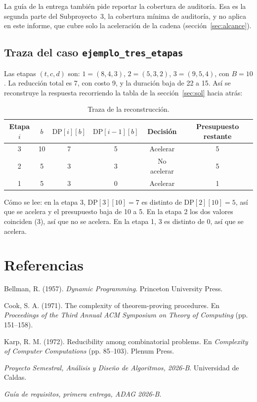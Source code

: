 \documentclass[11pt,a4paper]{article}
\newcommand{\DP}[2]{\mathrm{DP}[#1][#2]}
\theoremstyle{plano}
\begin{document}
La guía de la entrega también pide reportar la cobertura de auditoría. Esa es la segunda parte del Subproyecto~3, la cobertura mínima de auditoría, y no aplica en este informe, que cubre solo la aceleración de la cadena (sección~\ref{sec:alcance}).

\subsection{Traza del caso \texttt{ejemplo\_tres\_etapas}}
\label{sub:traza}

Las etapas $(t,c,d)$ son: $1=(8,4,3)$, $2=(5,3,2)$, $3=(9,5,4)$, con $B=10$. La reducción total es 7, con costo 9, y la duración baja de 22 a 15. Así se reconstruye la respuesta recorriendo la tabla de la sección~\ref{sec:sol} hacia atrás:

\begin{table}[h]
\centering
\begin{tabular}{cccccc}
\toprule
Etapa $i$ & $b$ & $\DP{i}{b}$ & $\DP{i-1}{b}$ & Decisión & Presupuesto restante \\
\midrule
3 & 10 & 7 & 5 & Acelerar & 5 \\
2 & 5 & 3 & 3 & No acelerar & 5 \\
1 & 5 & 3 & 0 & Acelerar & 1 \\
\bottomrule
\end{tabular}
\caption{Traza de la reconstrucción.}
\label{tab:traza}
\end{table}

Cómo se lee: en la etapa 3, $\DP{3}{10}=7$ es distinto de $\DP{2}{10}=5$, así que se acelera y el presupuesto baja de 10 a 5. En la etapa 2 los dos valores coinciden (3), así que no se acelera. En la etapa 1, 3 es distinto de 0, así que se acelera.

\section*{Referencias}
\begin{enumerate}[label={[\arabic*]},leftmargin=2em,itemsep=4pt]
  \item Bellman, R. (1957). \textit{Dynamic Programming}. Princeton University Press.
  \item Cook, S. A. (1971). The complexity of theorem-proving procedures. En \textit{Proceedings of the Third Annual ACM Symposium on Theory of Computing} (pp. 151--158).
  \item Karp, R. M. (1972). Reducibility among combinatorial problems. En \textit{Complexity of Computer Computations} (pp. 85--103). Plenum Press.
  \item \textit{Proyecto Semestral, Análisis y Diseño de Algoritmos, 2026-B}. Universidad de Caldas.
  \item \textit{Guía de requisitos, primera entrega, ADAG 2026-B}.
\end{enumerate}
\end{document}
